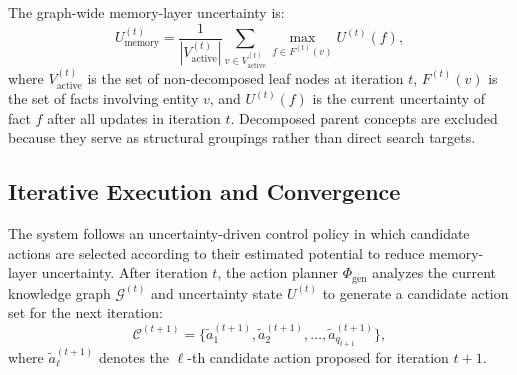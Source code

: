 \documentclass{article}
\begin{document}
The graph-wide memory-layer uncertainty is:
\begin{equation}
U_{\text{memory}}^{(t)}
=
\frac{1}{|V_{\text{active}}^{(t)}|}
\sum_{v \in V_{\text{active}}^{(t)}}
\max_{f \in F^{(t)}(v)}
U^{(t)}(f),
\end{equation}
where $V_{\text{active}}^{(t)}$ is the set of non-decomposed leaf nodes at iteration $t$, $F^{(t)}(v)$ is the set of facts involving entity $v$, and $U^{(t)}(f)$ is the current uncertainty of fact $f$ after all updates in iteration $t$. Decomposed parent concepts are excluded because they serve as structural groupings rather than direct search targets.

\subsection{Iterative Execution and Convergence}
\label{subsec:execution-convergence}

The system follows an uncertainty-driven control policy in which candidate actions are selected according to their estimated potential to reduce memory-layer uncertainty. After iteration $t$, the action planner $\Phi_{\text{gen}}$ analyzes the current knowledge graph $\mathcal{G}^{(t)}$ and uncertainty state $U^{(t)}$ to generate a candidate action set for the next iteration:
\[
\mathcal{C}^{(t+1)}
=
\{\tilde{a}_1^{(t+1)}, \tilde{a}_2^{(t+1)}, \dots, \tilde{a}_{q_{t+1}}^{(t+1)}\},
\]
where $\tilde{a}_\ell^{(t+1)}$ denotes the $\ell$-th candidate action proposed for iteration $t+1$.
\end{document}
